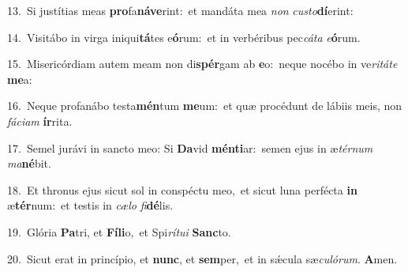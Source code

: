 {\numbfont\textcolor{\numbcolor}{13.}}~Si justítias meas \textbf{pro}\-fa\-\textbf{ná}\-\textbf{ve}rint:~\star et mandáta mea \textit{non} \textit{cus}\-\textit{to}\textbf{dí}erint:\par
{\numbfont\textcolor{\numbcolor}{14.}}~Visitábo in virga iniqui\-\textbf{tá}\-tes e\-\textbf{ó}\-rum:~\star et in verbéribus pec\-\textit{cá}\-\textit{ta} \textit{e}\-\textbf{ó}rum.\par
{\numbfont\textcolor{\numbcolor}{15.}}~Misericórdiam autem meam non di\-\textbf{spér}\-gam ab \textbf{e}\-o:~\star neque nocébo in ve\-\textit{ri}\-\textit{tá}\textit{te} \textbf{me}\-a:\par
{\numbfont\textcolor{\numbcolor}{16.}}~Neque profanábo testa\-\textbf{mén}\-tum \textbf{me}\-um:~\star et quæ procédunt de lábiis meis, non \textit{fá}\-\textit{ci}\textit{am} \textbf{ír}\-rita.\par
{\numbfont\textcolor{\numbcolor}{17.}}~Semel jurávi in sancto meo: Si \textbf{Da}\-vid \textbf{mén}\-\textbf{ti}ar:~\star semen ejus in æ\-\textit{tér}\-\textit{num} \textit{ma}\-\textbf{né}bit.\par
{\numbfont\textcolor{\numbcolor}{18.}}~Et thronus ejus sicut sol in conspéctu meo,~\dagger et sicut luna perfécta \textbf{in} æ\-\textbf{tér}\-num:~\star et testis in \textit{cæ}\-\textit{lo} \textit{fi}\-\textbf{dé}lis.\par
{\numbfont\textcolor{\numbcolor}{19.}}~Glória \textbf{Pa}\-tri, et \textbf{Fí}\-\textbf{li}o,~\star et Spi\-\textit{rí}\-\textit{tu}\textit{i} \textbf{Sanc}\-to.\par
{\numbfont\textcolor{\numbcolor}{20.}}~Sicut erat in princípio, et \textbf{nunc}\-, et \textbf{sem}\-per,~\star et in sǽcula sæ\-\textit{cu}\-\textit{ló}\textit{rum}. \textbf{A}\-men.\par
